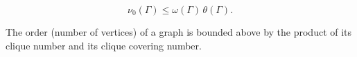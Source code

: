 $$\nu_0(\Gamma) \leq \omega(\Gamma)\,\theta(\Gamma).$$

The order (number of vertices) of a graph is bounded above by the product of its clique number and its clique covering number.
